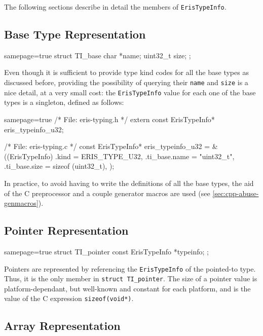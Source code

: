 \noindent
The following sections describe in detail the members of \verb|ErisTypeInfo|.


\subsection{Base Type Representation}

\begin{ccode*}{samepage=true}
  struct TI_base {
    char               *name;
    uint32_t            size;
  };
\end{ccode*}

\noindent
Even though it is sufficient to provide type kind codes for all the base types
as discussed before, providing the possibility of querying their \verb|name|
and \verb|size| is a nice detail, at a very small cost: the
\verb|ErisTypeInfo| value for each one of the base types is a singleton,
defined as follows:

\begin{ccode*}{samepage=true}
  /* File: eris-typing.h */
  extern const ErisTypeInfo* eris_typeinfo_u32;

  /* File: eris-typing.c */
  const ErisTypeInfo* eris_typeinfo_u32 = &((ErisTypeInfo) {
    .kind         = ERIS_TYPE_U32,
    .ti_base.name = "uint32_t",
    .ti_base.size = sizeof (uint32_t),
  });
\end{ccode*}

\noindent
In practice, to avoid having to write the definitions of all the base types,
the aid of the C preprocessor and a couple generator macros are used (see
\autoref{sec:cpp-abuse-genmacros}).


\subsection{Pointer Representation}
  \label{sec:pointer-typeinfo}

\begin{ccode*}{samepage=true}
  struct TI_pointer {
    const ErisTypeInfo *typeinfo;
  };
\end{ccode*}

\noindent
Pointers are represented by referencing the \verb|ErisTypeInfo| of the
pointed-to type. Thus, it is the only member in \texttt{struct
TI_pointer}. The size of a pointer value is platform-dependant, but well-known
and constant for each platform, and is the value of the C expression
\texttt{sizeof(void*)}.


\subsection{Array Representation}

